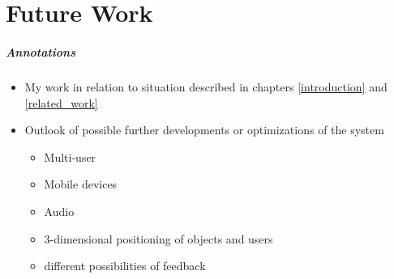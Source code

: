 \chapter{Future Work}
\label{future_work}

\paragraph*{Annotations}

\begin{itemize}
	\item My work in relation to situation described in chapters \ref{introduction} and \ref{related_work}
	\item Outlook of possible further developments or optimizations of the system
	\begin{itemize}
		\item Multi-user
		\item Mobile devices
		\item Audio
		\item 3-dimensional positioning of objects and users
		\item different possibilities of feedback 
	\end{itemize}
\end{itemize}
